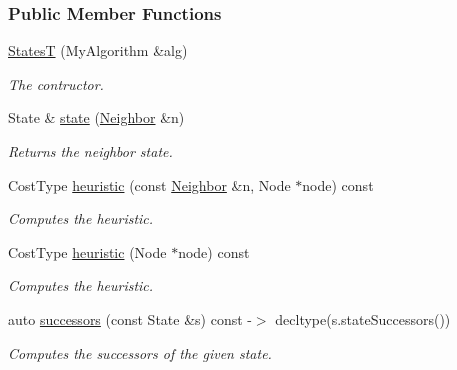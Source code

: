 \subsubsection*{Public Member Functions}
\begin{DoxyCompactItemize}
\item 
\hyperlink{structslb_1_1ext_1_1policy_1_1generator_1_1StatesT_a916419a80c9c874b469b3286077104c0}{StatesT} (My\+Algorithm \&alg)
\begin{DoxyCompactList}\small\item\em The contructor. \end{DoxyCompactList}\item 
State \& \hyperlink{structslb_1_1ext_1_1policy_1_1generator_1_1StatesT_aa9dbb1d35fbdddd48540c89d0874557d}{state} (\hyperlink{structslb_1_1ext_1_1policy_1_1generator_1_1StatesT_aa66abe249317f4cb57225481bb25a1f9}{Neighbor} \&n)
\begin{DoxyCompactList}\small\item\em Returns the neighbor state. \end{DoxyCompactList}\item 
Cost\+Type \hyperlink{structslb_1_1ext_1_1policy_1_1generator_1_1StatesT_aa000bb3f252fb9f3f7ef97d417f8d931}{heuristic} (const \hyperlink{structslb_1_1ext_1_1policy_1_1generator_1_1StatesT_aa66abe249317f4cb57225481bb25a1f9}{Neighbor} \&n, Node $\ast$node) const 
\begin{DoxyCompactList}\small\item\em Computes the heuristic. \end{DoxyCompactList}\item 
Cost\+Type \hyperlink{structslb_1_1ext_1_1policy_1_1generator_1_1StatesT_a9eeea9c9de44f7c15f4833121feeb7cb}{heuristic} (Node $\ast$node) const 
\begin{DoxyCompactList}\small\item\em Computes the heuristic. \end{DoxyCompactList}\item 
auto \hyperlink{structslb_1_1ext_1_1policy_1_1generator_1_1StatesT_a33a50f9a5a385e7285d82232359f0aab}{successors} (const State \&s) const -\/$>$ decltype(s.\+state\+Successors())
\begin{DoxyCompactList}\small\item\em Computes the successors of the given state. \end{DoxyCompactList}\end{DoxyCompactItemize}
